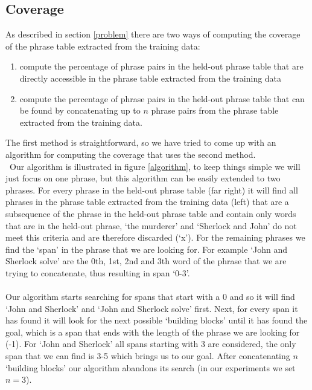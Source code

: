 \documentclass[11pt]{article}
\begin{document}
\subsection{Coverage}
\label{implem2}
As described in section \ref{problem} there are two ways of computing the coverage of the phrase table extracted from the training data:
\begin{enumerate}
\item compute the percentage of phrase pairs in the held-out phrase table that are directly accessible in the phrase table extracted from the training data
\item compute the percentage of phrase pairs in the held-out phrase table that can be found by concatenating up to $n$ phrase pairs from the phrase table extracted from the training data.
\end{enumerate}
The first method is straightforward, so we have tried to come up with an algorithm for computing the coverage that uses the second method. \\\
Our algorithm is illustrated in figure \ref{algorithm}, to keep things simple we will just focus on one phrase, but this algorithm can be easily extended to two phrases. For every phrase in the held-out phrase table (far right) it will find all phrases in the phrase table extracted from the training data (left) that are a subsequence of the phrase in the held-out phrase table and contain only words that are in the held-out phrase, `the murderer' and `Sherlock and John' do not meet this criteria and are therefore discarded (`x'). For the remaining phrases we find the `span' in the phrase that we are looking for. For example `John and Sherlock solve' are the 0th, 1st, 2nd and 3th word of the phrase that we are trying to concatenate, thus resulting in span `0-3'. \\\\
Our algorithm starts searching for spans that start with a 0 and so it will find `John and Sherlock' and `John and Sherlock solve' first. Next, for every span it has found it will look for the next possible `building blocks' until it has found the goal, which is a span that ends with the length of the phrase we are looking for (-1). For  `John and Sherlock' all spans starting with 3 are considered, the only span that we can find is 3-5 which brings us to our goal. After concatenating $n$ `building blocks' our algorithm abandons its search (in our experiments we set $n=3$).
\end{document}
